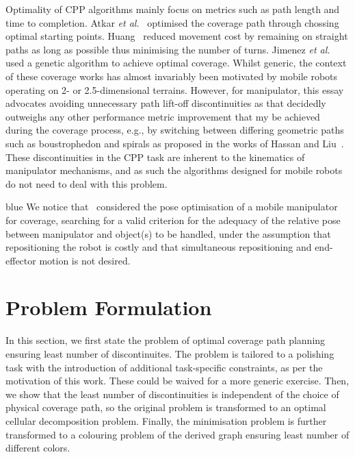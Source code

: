\documentclass[journal]{IEEEtran}
\begin{document}
Optimality of CPP algorithms mainly focus on metrics such as path length and time to completion.
Atkar \textit{et al.}~\cite{Atkar2003Towards} optimised the coverage path through chossing optimal starting points. 
Huang~\cite{huang2001optimal} reduced movement cost by remaining on straight paths as long as possible thus minimising the number of turns. 
Jimenez \textit{et al.}~\cite{jimenez2007optimal} used a genetic algorithm to achieve optimal coverage. 
Whilst generic, the context of these coverage works has almost invariably been motivated by mobile robots operating on 2- or 2.5-dimensional terrains. However, for manipulator, this essay advocates avoiding unnecessary path lift-off discontinuities as that decidedly outweighs any other performance metric improvement that my be achieved during the coverage process, e.g., by switching between differing geometric paths such as boustrophedon and spirals as proposed in the works of Hassan and Liu~\cite{hassan2018a}. 
These discontinuities in the CPP task are inherent to the kinematics of manipulator mechanisms, and as such the algorithms designed for mobile robots do not need to deal with this problem. 
\begin{color}{blue}
We notice that~\cite{paus2017a} considered the pose 
optimisation of a mobile manipulator for coverage, searching for a valid criterion for the adequacy of the relative pose between manipulator and object(s) to be handled, under the assumption that repositioning the robot is costly and that simultaneous repositioning and end-effector motion is not desired. 
\end{color}

\section{Problem Formulation}\label{sectionproblemformulation}
In this section, we first state the problem of optimal coverage path planning ensuring least number of discontinuites.
The problem is tailored to a polishing task with the introduction of additional task-specific constraints, as per the motivation of this work. These could be waived for a more generic exercise. %
Then, we show that the least number of discontinuities is independent of the choice of physical coverage path, 
so the original problem is transformed to an optimal cellular decomposition problem. 
Finally, the minimisation problem is further transformed to a colouring problem of the derived graph ensuring least number of different colors. 
\end{document}
